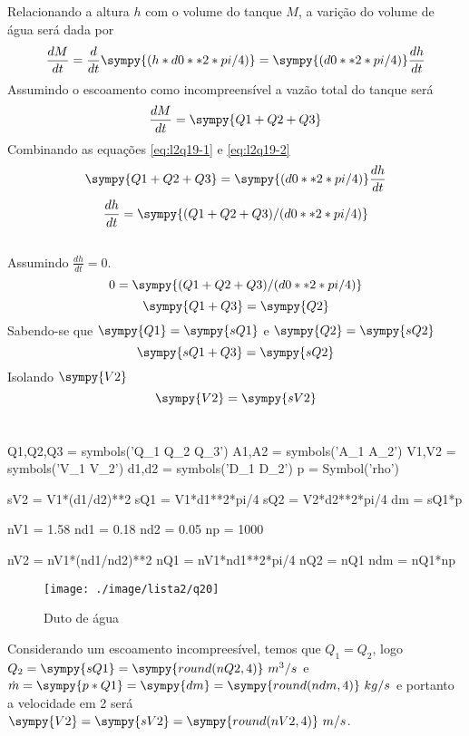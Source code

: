 \documentclass[a4paper,twocolumn,11pt]{article}
\newcommand{\npy}[1]{\sympy{round(n#1,4)}}
\newcommand{\epy}[1]{\sympy{#1} = \sympy{s#1}}
\begin{document}
\subsection{}
Relacionando a altura $h$ com o volume do tanque $M$, a varição do volume de água será dada por
\begin{equation}\label{eq:l2q19-1}
\frac{d M}{dt} = \frac{d}{dt}\sympy{(h * d0**2*pi/4)} = \sympy{(d0**2*pi/4)}\frac{d h}{dt}
\end{equation}
Assumindo o escoamento como incompreensível a vazão total do tanque será
\begin{equation}\label{eq:l2q19-2}
\frac{d M}{dt} = \sympy{Q1+Q2+Q3}
\end{equation}
Combinando as equações \eqref{eq:l2q19-1} e \eqref{eq:l2q19-2}
$$\sympy{Q1+Q2+Q3} = \sympy{(d0**2*pi/4)}\frac{d h}{dt}$$
\begin{equation}
\frac{d h}{dt} = \sympy{(Q1+Q2+Q3)/(d0**2*pi/4)}
\end{equation}

\subsection{}
Assumindo $\frac{d h}{dt} = 0$.
$$0 = \sympy{(Q1+Q2+Q3)/(d0**2*pi/4)}$$
$$\sympy{Q1+Q3} = \sympy{Q2}$$
Sabendo-se que $\epy{Q1}$ e $\epy{Q2}$
$$\sympy{sQ1+Q3} = \sympy{sQ2}$$
Isolando $\sympy{V2}$
$$\epy{V2}$$

\section{} %
\begin{sympycode}
Q1,Q2,Q3 = symbols('Q_1 Q_2 Q_3')
A1,A2 = symbols('A_1 A_2')
V1,V2 = symbols('V_1 V_2')
d1,d2 = symbols('D_1 D_2')
p = Symbol('rho')

sV2 = V1*(d1/d2)**2
sQ1 = V1*d1**2*pi/4
sQ2 = V2*d2**2*pi/4
dm = sQ1*p

nV1 = 1.58
nd1 = 0.18
nd2 = 0.05
np = 1000

nV2 = nV1*(nd1/nd2)**2
nQ1 = nV1*nd1**2*pi/4
nQ2 = nQ1
ndm = nQ1*np
\end{sympycode}
\begin{figure}[H]
\centering
\label{fig:l2q20}
\texttt{[image: ./image/lista2/q20]}
\caption{Duto de água}
\end{figure}

Considerando um escoamento incompreesível, temos que $Q_1 = Q_2$, logo $Q_2 = \sympy{sQ1} = \npy{Q2}\ m^3/s$ e $\dot{m} = \sympy{p*Q1} = \sympy{dm} = \npy{dm}\ kg/s$ e portanto a velocidade em 2 será $\epy{V2} = \npy{V2}\ m/s$.
\end{document}
